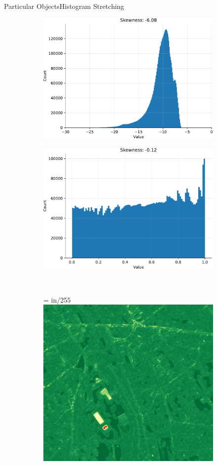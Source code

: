 \documentclass{beamer}
\begin{document}
\begin{frame}{Particular Objects}{Histogram Stretching}
\begin{figure}[H]
		\centering
		
		\begin{subfigure}{.48\textwidth}
			\centering
			\includegraphics[width=.48\textwidth]{Skew_GMM_wo_cl1}
		\end{subfigure}
		\begin{subfigure}{.48\textwidth}
			\centering
			\includegraphics[width=.48\textwidth]{Skew_GMM_wo_cl1_eq}
		\end{subfigure}\\
		\begin{subfigure}{.45\textwidth}
			\centering
			\pdfpxdimen= in/255\relax
			\includegraphics[clip, trim=0 23px 310px 500px, width=\textwidth]{ZH_wo_cl_1_df_im_1}

\end{subfigure}
\end{figure}
\end{frame}
\end{document}
